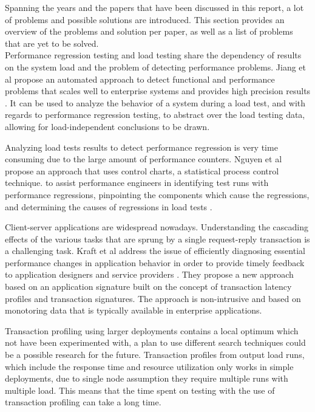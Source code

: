 Spanning the years and the papers that have been discussed in this report, a lot of problems and possible solutions are introduced. This section provides an overview of the problems and solution per paper, as well as a list of problems that are yet to be solved.\\

Performance regression testing and load testing share the dependency of results on the system load and the problem of detecting performance problems. Jiang et al propose an automated approach to detect functional and performance problems that scales well to enterprise systems and provides high precision results \cite{jiang2010automated}. It can be used to analyze the behavior of a system during a load test, and with regards to performance regression testing, to abstract over the load testing data, allowing for load-independent conclusions to be drawn.

Analyzing load tests results to detect performance regression is
very time consuming due to the large amount of performance
counters. Nguyen et al propose an approach that uses control charts, a statistical process control technique. to assist performance engineers in identifying test runs with performance regressions, pinpointing the components which cause the regressions, and determining the causes of regressions in load tests \cite{nguyen2012using}.

Client-server applications are widespread nowadays. Understanding the cascading effects of the various tasks that are sprung by a single request-reply transaction is a challenging task. Kraft et al address the issue of efficiently diagnosing essential performance changes in application behavior in order to provide timely feedback to  application designers and service providers \cite{kraft2009estimating}. They propose a new approach based on an application signature built on the concept of transaction latency profiles and transaction signatures. The approach is non-intrusive and based on monotoring data that is typically available in enterprise applications.

Transaction profiling using larger deployments contains a local optimum which not have been experimented with, a plan to use different search techniques could be a possible research for the future. \cite{ghaith2013profile} Transaction profiles from output load runs, which include the response time and resource utilization only works in simple deployments, due to single node assumption they require multiple runs with multiple load. This means that the time spent on testing with the use of transaction profiling can take a long time.

